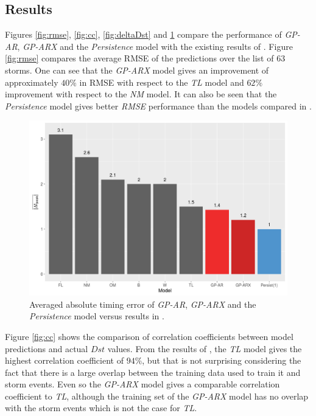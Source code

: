 \documentclass[referee,a4paper,12pt,traditabstract]{swsc}
\begin{document}
\begin{linenumbers}
\section{Results} \label{sec:res}


Figures \ref{fig:rmse}, \ref{fig:cc}, \ref{fig:deltaDst} and \ref{fig:timingErr} compare the performance of \emph{GP-AR}, \emph{GP-ARX} and the \emph{Persistence} model with the existing results of \citet{Ji2012}. Figure \ref{fig:rmse} compares the average RMSE of the predictions over the list of 63 storms. One can see that the \emph{GP-ARX} model gives an improvement of approximately $40\%$ in RMSE with respect to the \emph{TL} model and $62\%$ improvement with respect to the \emph{NM} model. It can also be seen that the \emph{Persistence} model gives better \emph{RMSE} performance than the models compared in \citet{Ji2012}.

\begin{figure}
   \centering
   \includegraphics[width=\textwidth]{Compare_timingerr.png}
      \caption{Averaged absolute timing error of \emph{GP-AR}, \emph{GP-ARX} and the \emph{Persistence} model versus results in \citet{Ji2012}.}
         \label{fig:timingErr}
   \end{figure}

Figure \ref{fig:cc} shows the comparison of correlation coefficients between model predictions and actual $Dst$ values. From the results of \citet{Ji2012}, the \emph{TL} model gives the highest correlation coefficient of $94\%$, but that is not surprising considering the fact that there is a large overlap between the training data used to train it and storm events. Even so the \emph{GP-ARX} model gives a comparable correlation coefficient to \emph{TL}, although the training set of the \emph{GP-ARX} model has no overlap with the storm events which is not the case for \emph{TL}.


\end{linenumbers}
\end{document}
